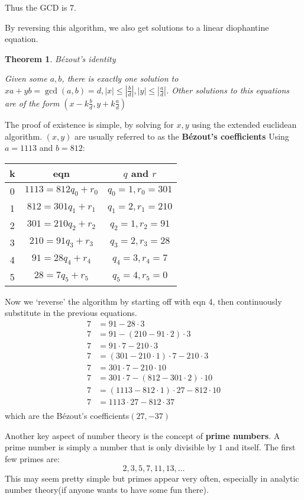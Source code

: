 \documentclass{report}
\newtheorem{theorem}{Theorem}[section]
\begin{document}
Thus the GCD is $7$.

By reversing this algorithm, we also get solutions to a linear diophantine equation.

\begin{theorem}
	B\'ezout's identity
	
	Given some $a,b$, there is exactly one solution to $xa+yb=\gcd(a,b)=d,|x|\leq|\frac{b}{d}|,|y|\leq|\frac{a}{d}|$. Other solutions to this equations are of the form $\left(x-k\frac{b}{d},y+k\frac{a}{d}\right)$
\end{theorem}
The proof of existence is simple, by solving for $x,y$ using the extended euclidean algorithm. $(x,y)$ are usually referred to as the \textbf{B\'ezout's coefficients} Using $a=1113$ and $b=812$:

\begin{tabular}{|c|c|c|}\hline
	k&eqn&$q$ and $r$\\\hline
	0&$1113=812q_0+r_0$&$q_0=1,r_0=301$\\\hline
	1&$812=301q_1+r_1$&$q_1=2,r_1=210$\\\hline
	2&$301=210q_2+r_2$&$q_2=1,r_2=91$\\\hline
	3&$210=91q_3+r_3$&$q_3=2,r_3=28$\\\hline
	4&$91=28q_4+r_4$&$q_4=3,r_4=7$\\\hline
	5&$28=7q_5+r_5$&$q_5=4,r_5=0$\\\hline
\end{tabular}

Now we `reverse' the algorithm by starting off with eqn 4, then continuously substitute in the previous equations.
\begin{align*}
7&=91-28\cdot3\\
7&=91-\left(210-91\cdot2\right)\cdot3\\
7&=91\cdot7-210\cdot3\\
7&=(301-210\cdot1)\cdot7-210\cdot3\\
7&=301\cdot7-210\cdot10\\
7&=301\cdot7-(812-301\cdot2)\cdot10\\
7&=(1113-812\cdot1)\cdot27-812\cdot10\\
7&=1113\cdot27-812\cdot37\\
\end{align*}
which are the B\'ezout's coefficients$(27,-37)$

Another key aspect of number theory is the concept of \textbf{prime numbers}. A prime number is simply a number that is only divisible by $1$ and itself. The first few primes are:
$$2,3,5,7,11,13,\dots$$
This may seem pretty simple but primes appear very often, especially in analytic number theory(if anyone wants to have some fun there).
\end{document}
